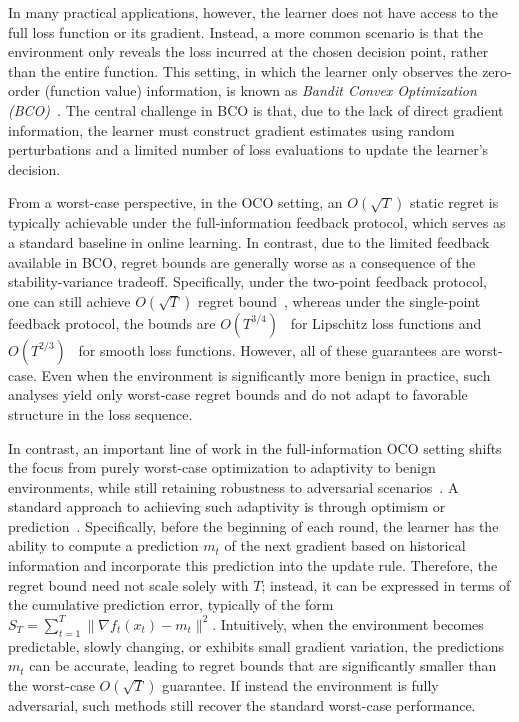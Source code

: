 \documentclass[journal,onecolumn]{IEEEtran}
\theoremstyle{plain}
\theoremstyle{definition}
\theoremstyle{remark}
\begin{document}
In many practical applications, however, the learner does not have access to the full loss function or its gradient. Instead, a more common scenario is that the environment only reveals the loss incurred at the chosen decision point, rather than the entire function. This setting, in which the learner only observes the zero-order (function value) information, is known as \emph{Bandit Convex Optimization (BCO)}~\cite{flaxman2004online,lattimore2024bandit}. The central challenge in BCO is that, due to the lack of direct gradient information, the learner must construct gradient estimates using random perturbations and a limited number of loss evaluations to update the learner's decision.

From a worst-case perspective, in the OCO setting, an $O(\sqrt{T})$ static regret is typically achievable under the full-information feedback protocol, which serves as a standard baseline in online learning. In contrast, due to the limited feedback available in BCO, regret bounds are generally worse as a consequence of the stability-variance tradeoff. Specifically, under the two-point feedback protocol, one can still achieve $O(\sqrt{T})$ regret bound~\cite{shamir2017optimal}, whereas under the single-point feedback protocol, the bounds are $O(T^{3/4})$~\cite{flaxman2004online} for Lipschitz loss functions and $O(T^{2/3})$~\cite{saha2011improved} for smooth loss functions. However, all of these guarantees are worst-case. Even when the environment is significantly more benign in practice, such analyses yield only worst-case regret bounds and do not adapt to favorable structure in the loss sequence.

In contrast, an important line of work in the full-information OCO setting shifts the focus from purely worst-case optimization to adaptivity to benign environments, while still retaining robustness to adversarial scenarios~\cite{chiang2012online,zhao2024adaptivity}. A standard approach to achieving such adaptivity is through optimism or prediction~\cite{rakhlin2013online,steinhardt2014adaptivity}. Specifically, before the beginning of each round, the learner has the ability to compute a prediction $m_t$ of the next gradient based on historical information and incorporate this prediction into the update rule. Therefore, the regret bound need not scale solely with $T$; instead, it can be expressed in terms of the cumulative prediction error, typically of the form $S_T=\sum_{t=1}^T \|\nabla f_t(x_t)-m_t\|^2$. Intuitively, when the environment becomes predictable, slowly changing, or exhibits small gradient variation, the predictions $m_t$ can be accurate, leading to regret bounds that are significantly smaller than the worst-case $O(\sqrt{T})$ guarantee. If instead   the environment is fully adversarial, such methods still recover the standard worst-case performance.
\end{document}
